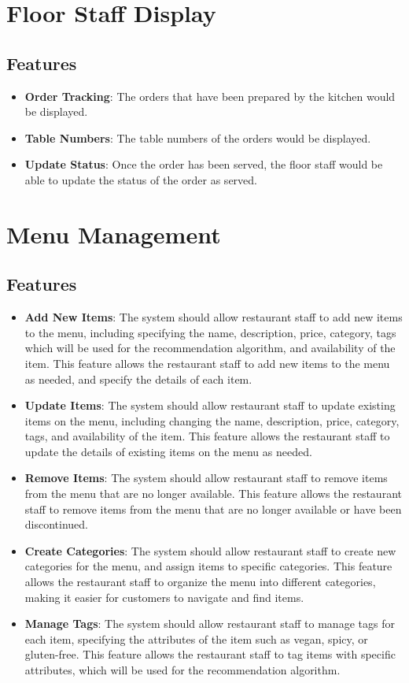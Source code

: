 \section{Floor Staff Display}
\subsection{Features}
\begin{itemize}
    \item \textbf{Order Tracking}: The orders that have been prepared by the kitchen would be displayed.
    \item \textbf{Table Numbers}: The table numbers of the orders would be displayed.
    \item \textbf{Update Status}: Once the order has been served, the floor staff would be able to update the status of the order as served.
\end{itemize}

\section{Menu Management}
\subsection{Features}
\begin{itemize}
    \item \textbf{Add New Items}: The system should allow restaurant staff to add new items to the menu, including specifying the name, description, price, category, tags which will be used for the recommendation algorithm, and availability of the item. This feature allows the restaurant staff to add new items to the menu as needed, and specify the details of each item.
    \item \textbf{Update Items}: The system should allow restaurant staff to update existing items on the menu, including changing the name, description, price, category, tags, and availability of the item. This feature allows the restaurant staff to update the details of existing items on the menu as needed.
    \item \textbf{Remove Items}: The system should allow restaurant staff to remove items from the menu that are no longer available. This feature allows the restaurant staff to remove items from the menu that are no longer available or have been discontinued.
    \item \textbf{Create Categories}: The system should allow restaurant staff to create new categories for the menu, and assign items to specific categories. This feature allows the restaurant staff to organize the menu into different categories, making it easier for customers to navigate and find items.
    \item \textbf{Manage Tags}: The system should allow restaurant staff to manage tags for each item, specifying the attributes of the item such as vegan, spicy, or gluten-free. This feature allows the restaurant staff to tag items with specific attributes, which will be used for the recommendation algorithm.
\end{itemize}